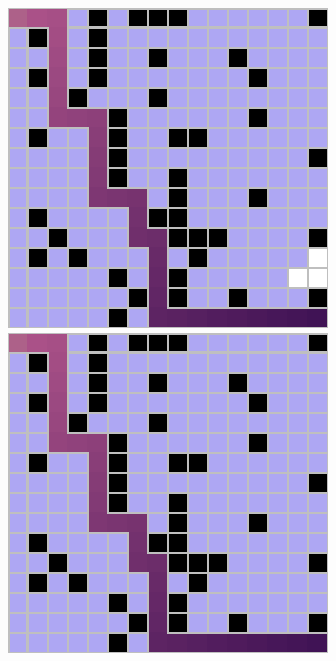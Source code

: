 \documentclass[letter]{article}
\begin{document}
\begin{questions}
	\begin{figure}
		\includegraphics[width=\linewidth]{../pics/16/DFS IDDFS checkFringe 8453 31 29.png}
		\caption{}\label{fig:q2-4}
		\endminipage\hfill
		\includegraphics[width=\linewidth]{../pics/16/DFS keepSearch checkFringe 1118 31 35.png}

\end{figure}
\end{questions}
\end{document}
